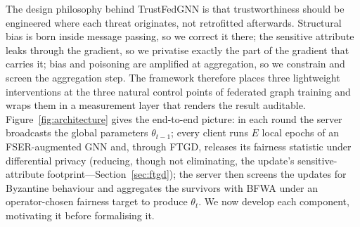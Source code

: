 \documentclass[pdflatex,sn-mathphys-num]{sn-jnl}
\theoremstyle{thmstyleone}%
\theoremstyle{thmstyletwo}%
\theoremstyle{thmstylethree}%
\begin{document}
The design philosophy behind TrustFedGNN is that trustworthiness should be
engineered where each threat originates, not retrofitted afterwards. Structural
bias is born inside message passing, so we correct it there; the sensitive
attribute leaks through the gradient, so we privatise exactly the part of the
gradient that carries it; bias and poisoning are amplified at aggregation, so we
constrain and screen the aggregation step. The framework therefore places three
lightweight interventions at the three natural control points of federated graph
training and wraps them in a measurement layer that renders the result
auditable. Figure~\ref{fig:architecture} gives the end-to-end picture: in each
round the server broadcasts the global parameters $\theta_{t-1}$; every client
runs $E$ local epochs of an FSER-augmented GNN and, through FTGD, releases its
fairness statistic under differential privacy (reducing, though not eliminating,
the update's sensitive-attribute footprint---Section~\ref{sec:ftgd}); the server
then screens the updates for Byzantine behaviour and aggregates the survivors
with BFWA under an operator-chosen fairness target to produce $\theta_t$. We now
develop each
component, motivating it before formalising it.
\end{document}
